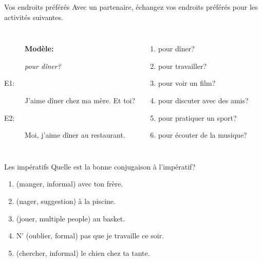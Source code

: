 \documentclass{beamer}
\begin{document}
  \begin{frame}{Vos endroits préférés }
    Avec un partenaire, échangez vos endroits préférés pour les activités suivantes. \\
    \begin{columns}
        \begin{description}
          \item[] \textbf{Modèle:}
          \item[] \emph{pour dîner?}
          \item[E1:] J'aime dîner chez ma mère. Et toi?
          \item[] 
          \item[E2:] Moi, j'aime dîner au restaurant.
          \item[] 
        \end{description}
        \begin{enumerate}
          \item pour dîner?
          \item pour travailler?
          \item pour voir un film?
          \item pour discuter avec des amis?
          \item pour pratiquer un sport?
          \item pour écouter de la musique?
        \end{enumerate}
    \end{columns}
  \end{frame}

  \begin{frame}{Les impératifs }
    Quelle est la bonne conjugaison à l'impératif? \\
    \begin{enumerate}
      \item \underline{} (manger, informal) avec ton frère.
      \item \underline{} (nager, suggestion) à la piscine.
      \item \underline{} (jouer, multiple people) au basket.
      \item N'\underline{} (oublier, formal) pas que je travaille ce soir.
      \item \underline{} (chercher, informal) le chien chez ta tante.
    \end{enumerate}
  \end{frame}
\end{document}
